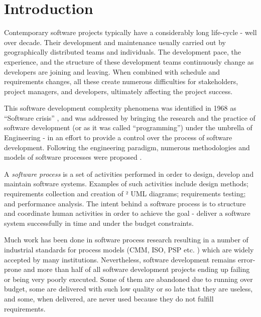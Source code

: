 \chapter{Introduction}
Contemporary software projects typically have a considerably long life-cycle - well over decade.
Their development and maintenance usually carried out by geographically distributed teams 
and individuals. The development pace, the experience, and the structure of these development 
teams continuously change as developers are joining and leaving. When combined with
schedule and requirements changes, all these create numerous difficulties for stakeholders,
project managers, and developers, ultimately affecting the project success. 

This software development complexity phenomena was identified in 1968 as ``Software crisis'' \cite{crisis}, 
and was addressed by bringing the research and the practice of software development 
(or as it was called ``programming'') under the umbrella of Engineering  - in an effort to provide a 
control over the process of software development. 
Following the engineering paradigm, numerous methodologies and models of software processes
were proposed \cite{citeulike:10002165}.

A \textit{software process} is a set of activities performed in order to design, develop and maintain 
software systems. Examples of such activities include design methods; requirements collection and creation of ²
UML diagrams; requirements testing; and performance analysis. 
The intent behind a software process is to structure and coordinate human activities in order to achieve 
the goal - deliver a software system successfully in time and under the budget constraints.

Much work has been done in software process research resulting in a number of industrial standards for 
process models (CMM, ISO, PSP etc. \cite{citeulike:5043104}) which are widely accepted by many institutions. 
Nevertheless, software development remains error-prone and more than half of all software development projects 
ending up failing or being very poorly executed. Some of them are abandoned due to running over budget,
 some are delivered with such low quality or so late that they are useless, and some, when delivered, 
are never used because they do not fulfill requirements. 


